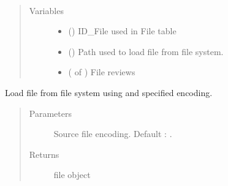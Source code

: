 \documentclass[letterpaper,10pt,english]{sphinxmanual}
\begin{document}
\begin{fulllineitems}
\label{\detokenize{classes:loacore.classes.classes.File}}~\begin{quote}\begin{description}
\item[{Variables}] \leavevmode\begin{itemize}
\item {} 
 () \textendash{} ID\_File used in File table

\item {} 
 () \textendash{} Path used to load file from file system.

\item {} 
 ( of {\hyperref[\detokenize{classes:loacore.classes.classes.Review}]{}}) \textendash{} File reviews

\end{itemize}

\end{description}\end{quote}

\begin{fulllineitems}
\label{\detokenize{classes:loacore.classes.classes.File.load}}
Load file from file system using  and specified encoding.
\begin{quote}\begin{description}
\item[{Parameters}] \leavevmode
{} \textendash{} Source file encoding. Default : .

\item[{Returns}] \leavevmode
file object

\end{description}\end{quote}


\end{fulllineitems}
\end{fulllineitems}
\end{document}
